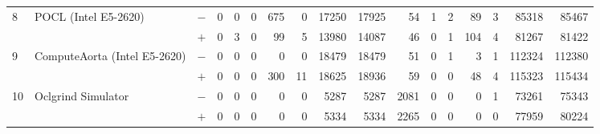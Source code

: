 \begin{tabular}{lll | rrrrrrr | rrrrrrr }
\hline
\multirow{ 2}{*}{8} & \multirow{ 2}{*}{POCL (Intel E5-2620)} & $-$ & 0 & 0 & 0 & 675 & 0 & 17250 & 17925       & 54 & 1 & 2 & 89 & 3 & 85318 & 85467 \\& & $+$ & 0 & 3 & 0 & 99 & 5 & 13980 & 14087 & 46 & 0 & 1 & 104 & 4 & 81267 & 81422 \\
\hline
\multirow{ 2}{*}{9} & \multirow{ 2}{*}{ComputeAorta (Intel E5-2620)} & $-$ & 0 & 0 & 0 & 0 & 0 & 18479 & 18479       & 51 & 0 & 1 & 3 & 1 & 112324 & 112380 \\& & $+$ & 0 & 0 & 0 & 300 & 11 & 18625 & 18936 & 59 & 0 & 0 & 48 & 4 & 115323 & 115434 \\
\hline
\multirow{ 2}{*}{10} & \multirow{ 2}{*}{Oclgrind Simulator} & $-$ & 0 & 0 & 0 & 0 & 0 & 5287 & 5287       & 2081 & 0 & 0 & 0 & 1 & 73261 & 75343 \\& & $+$ & 0 & 0 & 0 & 0 & 0 & 5334 & 5334 & 2265 & 0 & 0 & 0 & 0 & 77959 & 80224 \\
  

  \bottomrule
\end{tabular}

